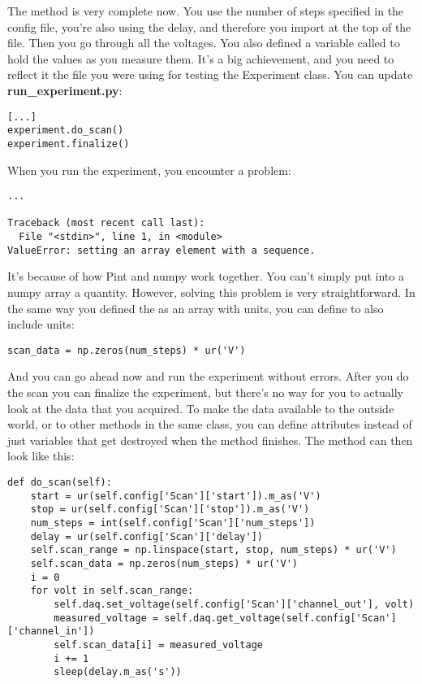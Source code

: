 The  method is very complete now. You use the number of steps specified in the config file, you're also using the delay, and therefore you import  at the top of the file. Then you go through all the voltages. You also defined a variable called  to hold the values as you measure them. It's a big achievement, and you need to reflect it the file you were using for testing the Experiment class. You can update \textbf{run\_experiment.py}:

\begin{verbatim}
[...]
experiment.do_scan()
experiment.finalize()
\end{verbatim}

When you run the experiment, you encounter a problem:

\begin{verbatim}
...

Traceback (most recent call last):
  File "<stdin>", line 1, in <module>
ValueError: setting an array element with a sequence.
\end{verbatim}

It's because of how Pint and numpy work together. You can't simply put into a numpy array a quantity. However, solving this problem is very straightforward. In the same way you defined the  as an array with units, you can define  to also include units:

\begin{verbatim}
scan_data = np.zeros(num_steps) * ur('V')
\end{verbatim}

And you can go ahead now and run the experiment without errors. After you do the scan you can finalize the experiment, but there's no way for you to actually look at the data that you acquired. To make the data available to the outside world, or to other methods in the same class, you can define attributes instead of just variables that get destroyed when the method finishes. The  method can then look like this:

\begin{verbatim}
def do_scan(self):
    start = ur(self.config['Scan']['start']).m_as('V')
    stop = ur(self.config['Scan']['stop']).m_as('V')
    num_steps = int(self.config['Scan']['num_steps'])
    delay = ur(self.config['Scan']['delay'])
    self.scan_range = np.linspace(start, stop, num_steps) * ur('V')
    self.scan_data = np.zeros(num_steps) * ur('V')
    i = 0
    for volt in self.scan_range:
        self.daq.set_voltage(self.config['Scan']['channel_out'], volt)
        measured_voltage = self.daq.get_voltage(self.config['Scan']['channel_in'])
        self.scan_data[i] = measured_voltage
        i += 1
        sleep(delay.m_as('s'))
\end{verbatim}

